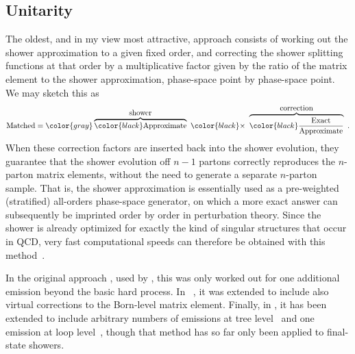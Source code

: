 %
%
\subsection{Unitarity}
The oldest, and in my view most attractive, 
approach \cite{Bengtsson:1986et,Bengtsson:1986hr}
  consists of working out the 
 shower approximation to a given fixed order, and correcting
 the shower splitting functions at that order by a multiplicative
 factor given by the ratio of the matrix element
 to the shower approximation, phase-space point by phase-space
 point. We may sketch this as 
\begin{equation}
\mbox{Matched} =
\color{gray}\overbrace{\color{black}\mbox{Approximate}}^{\mbox{shower}}
\ {\color{black}\times} \
\overbrace{\color{black}\frac{\mbox{Exact}}{\mbox{Approximate}}}^{\mbox{correction}}~. \label{eq:multiplicative}
\end{equation}
When these correction factors are inserted back into the
shower evolution, they guarantee that the shower evolution off $n-1$
partons correctly reproduces the $n$-parton matrix elements, 
without the need to generate a separate $n$-parton sample. 
That is, the shower approximation is essentially used as a 
pre-weighted (stratified) all-orders phase-space generator, on which a
more exact answer can subsequently be
imprinted order by order in perturbation theory. Since the shower is 
already optimized for exactly the kind of singular structures that
occur in QCD, very fast computational speeds can therefore be obtained
with this method~\cite{LopezVillarejo:2011ap}.


%
%
In the original
approach \cite{Bengtsson:1986et,Bengtsson:1986hr}, used by \Py
\cite{Sjostrand:2006za,Sjostrand:2014zea}, this was only 
worked out for one additional emission beyond the basic hard
process. 
%
In \Pw~\cite{Frixione:2007vw,Alioli:2010xd}, 
it was extended to include also virtual corrections to the Born-level
matrix element. 
%
%
%
Finally, in \Vc, it has been 
extended to include arbitrary numbers of emissions at tree
level~\cite{Giele:2011cb,LopezVillarejo:2011ap} and one emission at
loop level~\cite{Hartgring:2013jma}, though that method has so far
only been applied to final-state showers.

